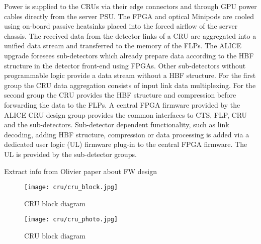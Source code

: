 Power is supplied to the CRUs via their edge connectors and through GPU power cables directly from the server PSU. The FPGA and optical Minipods are cooled using on-board passive heatsinks placed into the forced airflow of the server chassis.   
The received data from the detector links of a CRU are aggregated into a unified data stream and transferred to the memory of the FLPs. The ALICE upgrade foresees sub-detectors  which already prepare data according to the HBF structure in the detector front-end using FPGAs. Other sub-detectors without programmable logic provide a data stream without a HBF structure. For the first group the CRU data aggregation consists of input link data multiplexing. For the second group the CRU provides the HBF structure and compression before forwarding the data to the FLPs. A central FPGA firmware provided by the ALICE CRU design group provides the common interfaces to CTS, FLP, CRU and the sub-detectors. Sub-detector dependent functionality, such as link decoding, adding HBF structure, compression or data processing is added via a dedicated user logic (UL) firmware plug-in to the central FPGA firmware. The UL is provided by the sub-detector groups.

Extract info from Olivier paper about FW design


\begin{figure*}[hbtp]
  \begin{center}
    \texttt{[image: cru/cru\_block.jpg]}
  \end{center}
  \caption{CRU block diagram}
  \label{fig_ro:cru_block}
\end{figure*}

\begin{figure*}[hbtp]
  \begin{center}
    \texttt{[image: cru/cru\_photo.jpg]}
  \end{center}
  \caption{CRU block diagram}
  \label{fig_ro:cru_photo}
\end{figure*}

